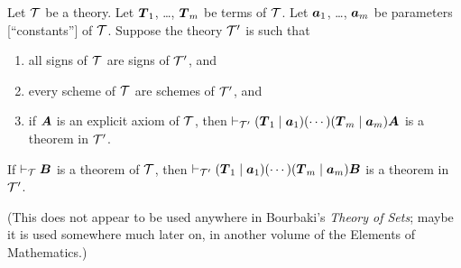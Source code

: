 \begin{dc}\label{c5}
Let $\mathcal{T}$ be a theory. Let $\boldsymbol{T}_{1}$, \dots,
$\boldsymbol{T}_{m}$ be terms of $\mathcal{T}$. Let
$\boldsymbol{a}_{1}$, \dots, $\boldsymbol{a}_{m}$ be parameters
[``constants''] of $\mathcal{T}$. Suppose the theory $\mathcal{T}'$ is
such that
\begin{enumerate}
\item all signs of $\mathcal{T}$ are signs of $\mathcal{T}'$, and
\item every scheme of $\mathcal{T}$ are schemes of $\mathcal{T}'$, and
\item if $\boldsymbol{A}$ is an explicit axiom of $\mathcal{T}$, then $\vdash_{\mathcal{T}'}(\boldsymbol{T}_{1}\mid\boldsymbol{a}_{1})(\cdots)(\boldsymbol{T}_{m}\mid\boldsymbol{a}_{m})\boldsymbol{A}$
is a theorem in $\mathcal{T}'$.
\end{enumerate}
If $\vdash_{\mathcal{T}}\boldsymbol{B}$ is a theorem of $\mathcal{T}$,
then 
$\vdash_{\mathcal{T}'}(\boldsymbol{T}_{1}\mid\boldsymbol{a}_{1})(\cdots)(\boldsymbol{T}_{m}\mid\boldsymbol{a}_{m})\boldsymbol{B}$
is a theorem in $\mathcal{T}'$.
\end{dc}
(This does not appear to be used anywhere in Bourbaki's \textit{Theory of Sets};
maybe it is used somewhere much later on, in another volume of the
Elements of Mathematics.)
